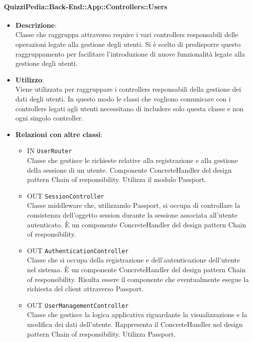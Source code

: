 \paragraph{QuizziPedia::Back-End::App::Controllers::Users}
\begin{itemize}
	\item 
	\textbf{Descrizione}:\\
	Classe che raggruppa attraverso require i vari controllers responsabili delle operazioni legate alla gestione degli utenti. Si è scelto di predisporre questo raggruppamento per facilitare l'introduzione di nuove funzionalità legate alla gestione degli utenti.
	\item \textbf{Utilizzo}:\\
	Viene utilizzata per raggruppare i controllers responsabili della gestione dei dati degli utenti. In questo modo le classi che vogliono comunicare con i controllers legati agli utenti necessitano di includere solo questa classe e non ogni singolo controller.
	\item \textbf{Relazioni con altre classi}:\\
	\begin{itemize}
		\item 
			IN	\texttt{UserRouter}\\
			Classe che gestisce le richieste relative alla registrazione e alla gestione della sessione di un utente. Componente ConcreteHandler del design pattern Chain of responsibility. Utilizza il modulo Passport.		
		\item 
			OUT \texttt{SessionController}\\
			Classe middleware che, utilizzando Passport, si occupa di controllare la consistenza dell'oggetto session durante la sessione associata all'utente autenticato. È un componente ConcreteHandler del design pattern Chain of responsibility.
		\item 
			OUT \texttt{AuthenticationController}\\
			Classe che si occupa della registrazione e dell'autenticazione dell'utente nel sistema. È un componente ConcreteHandler del design pattern Chain of responsibility. Risulta essere il componente che eventualmente esegue la richiesta del client attraverso Passport.	
		\item 
			OUT \texttt{UserManagementController}\\
			Classe che gestisce la logica applicativa riguardante la visualizzazione e la modifica dei dati dell'utente.
			Rappresenta il ConcreteHandler nel design pattern Chain of responsibility. Utilizza Passport.
	\end{itemize}
\end{itemize}
